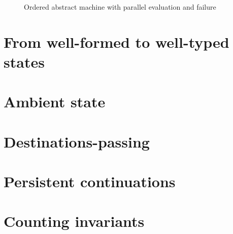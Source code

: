 \begin{figure}[tp]
\caption{Ordered abstract machine with parallel evaluation and failure}
\label{fig:ssos-fail}
\end{figure}


\section{From well-formed to well-typed states}

\section{Ambient state}




\section{Destinations-passing}
\label{sec:gen-destinations}


\section{Persistent continuations}
\label{sec:gen-letcc}

\section{Counting invariants}



\label{sec:pointer-inequality}
